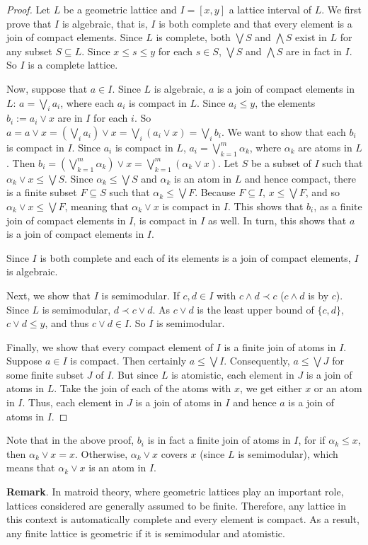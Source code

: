 \documentclass[12pt]{article}
\begin{document}
\begin{proof} Let $L$ be a geometric lattice and $I=[x,y]$ a lattice interval of $L$.  We first prove that $I$ is algebraic, that is, $I$ is both complete and that every element is a join of compact elements.  Since $L$ is complete, both $\bigvee S$ and $\bigwedge S$ exist in $L$ for any subset $S\subseteq L$.  Since $x\le s\le y$ for each $s\in S$, $\bigvee S$ and $\bigwedge S$ are in fact in $I$.  So $I$ is a complete lattice.  

Now, suppose that $a\in I$.  Since $L$ is algebraic, $a$ is a join of compact elements in $L$: $a=\bigvee_i a_i$, where each $a_i$ is compact in $L$.  Since $a_i\le y$, the elements $b_i:=a_i\vee x$ are in $I$ for each $i$.  So $a=a\vee x=(\bigvee_i a_i)\vee x=\bigvee_i (a_i\vee x)=\bigvee_i b_i$.  We want to show that each $b_i$ is compact in $I$.  Since $a_i$ is compact in $L$, $a_i=\bigvee_{k=1}^{m}\alpha_k$, where $\alpha_k$ are atoms in $L$.  Then $b_i=(\bigvee_{k=1}^{m}\alpha_k)\vee x=\bigvee_{k=1}^{m}(\alpha_k\vee x)$.  Let $S$ be a subset of $I$ such that $\alpha_k\vee x\le \bigvee S$.  Since $\alpha_k\le \bigvee S$ and $\alpha_k$ is an atom in $L$ and hence compact, there is a finite subset $F\subseteq S$ such that $\alpha_k\le \bigvee F$.  Because $F\subseteq I$, $x\le \bigvee F$, and so $\alpha_k\vee x\le \bigvee F$, meaning that $\alpha_k\vee x$ is compact in $I$.  This shows that $b_i$, as a finite join of compact elements in $I$, is compact in $I$ as well.  In turn, this shows that $a$ is a join of compact elements in $I$.

Since $I$ is both complete and each of its elements is a join of compact elements, $I$ is algebraic.

Next, we show that $I$ is semimodular.  If $c,d\in I$ with $c\wedge d\prec c$ ($c\wedge d$ is \emph{} by $c$).  Since $L$ is semimodular, $d\prec c\vee d$.  As $c\vee d$ is the least upper bound of $\lbrace c,d\rbrace$,  $c\vee d\le y$, and thus $c\vee d\in I$.  So $I$ is semimodular.  

Finally, we show that every compact element of $I$ is a finite join of atoms in $I$.  Suppose $a\in I$ is compact.  Then certainly $a\le \bigvee I$.  Consequently, $a\le \bigvee J$ for some finite subset $J$ of $I$.  But since $L$ is atomistic, each element in $J$ is a join of atoms in $L$.  Take the join of each of the atoms with $x$, we get either $x$ or an atom in $I$.  Thus, each element in $J$ is a join of atoms in $I$ and hence $a$ is a join of atoms in $I$.
\end{proof}

Note that in the above proof, $b_i$ is in fact a finite join of atoms in $I$, for if $\alpha_k\le x$, then $\alpha_k\vee x=x$.  Otherwise, $\alpha_k\vee x$ covers $x$ (since $L$ is semimodular), which means that $\alpha_k\vee x$ is an atom in $I$.

\textbf{Remark}.  In matroid theory, where geometric lattices play an important role, lattices considered are generally assumed to be finite.  Therefore, any lattice in this context is automatically complete and every element is compact.  As a result, any finite lattice is geometric if it is semimodular and atomistic.

\end{document}
